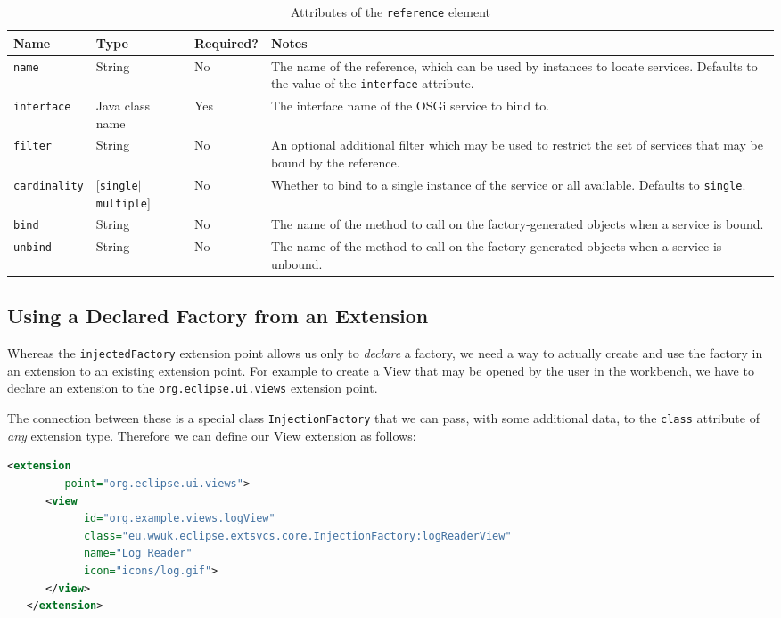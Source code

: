 \documentclass[12pt]{article}
\begin{document}
\begin{table}
	\centering
	\begin{tabular}{|l|l|l|p{5cm}|}
	\hline
	Name & Type & Required? & Notes \\
	\hline
	\texttt{name} & String & No & The name of the reference, which can be used by instances to locate services. Defaults to the value of the \texttt{interface} attribute.\\
	\hline
	\texttt{interface} & Java class name & Yes & The interface name of the OSGi service to bind to.\\
	\hline
	\texttt{filter} & String & No & An optional additional filter which may be used to restrict the set of services that may be bound by the reference.\\
	\hline
	\texttt{cardinality} & [\texttt{single}$|$\texttt{multiple}] & No & Whether to bind to a single instance of the service or all available. Defaults to \texttt{single}.\\
	\hline
	\texttt{bind} & String & No & The name of the method to call on the factory-generated objects when a service is bound.\\
	\hline
	\texttt{unbind} & String & No & The name of the method to call on the factory-generated objects when a service is unbound.\\
	\hline
	\end{tabular}
	\caption{Attributes of the \texttt{reference} element}
	\label{tbl:reference_element_attributes}
\end{table}

\subsection{Using a Declared Factory from an Extension}

Whereas the \texttt{injectedFactory} extension point allows us only to \emph{declare} a factory, we need a way to actually create and use the factory in an extension to an existing extension point. For example to create a View that may be opened by the user in the workbench, we have to declare an extension to the \texttt{org.eclipse.ui.views} extension point.

The connection between these is a special class \texttt{InjectionFactory} that we can pass, with some additional data, to the \texttt{class} attribute of \emph{any} extension type. Therefore we can define our View extension as follows:

\begin{lstlisting}[language=xml]
   <extension
         point="org.eclipse.ui.views">
      <view
            id="org.example.views.logView"
            class="eu.wwuk.eclipse.extsvcs.core.InjectionFactory:logReaderView"
            name="Log Reader"
            icon="icons/log.gif">
      </view>
   </extension>
\end{lstlisting}
\end{document}
